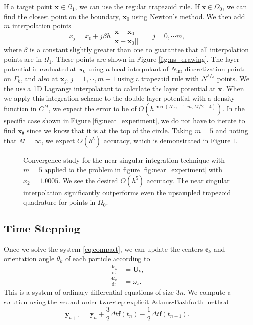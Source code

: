 If a target point $\mathbf{x}\in\Omega_1$, we can use the regular trapezoid rule. If $\mathbf{x}\in \Omega_0$, we can find the closest point on the boundary, $\mathbf{x}_0$ using Newton's method. We then add $m$ 
interpolation points
	\[ x_j = x_0 + j\beta h\frac{\mathbf{x}-\mathbf{x}_0}{||\mathbf{x}-\mathbf{x}_0||} \qquad j = 0,\cdots m,\]
where $\beta$ is a constant slightly greater than one to guarantee that all interpolation points are in $\Omega_1$. These points are shown in Figure \ref{fig:ns_drawing}. The layer potential is evaluated at $\mathbf{x}_0$ using a local interpolant of $N_\text{int}$ discretization points on $\Gamma_k$, and also at $\mathbf{x}_j$, $j=1,\cdots,m-1$ using a trapezoid rule with $N^{\sfrac{3}{2}}$ points.  We the use a 1D Lagrange interpolatant to calculate the layer potential at $\mathbf{x}$. When we apply this integration scheme to the double layer potential with a density function in $C^M$, we expect the error to be of $O(h^{\min(N_{\text{int}} - 1, m,  M/2 - 4)})$. In the specific case shown in Figure \ref{fig:near_experiment}, we do not have to iterate to find $\mathbf{x}_0$ since we know that it is at the top of the circle. Taking $m=5$ and noting that $M=\infty$, we expect $O(h^5)$ accuracy, which is demonstrated in Figure \ref{fig:ns_convergence}. 

\begin{figure}[!h]
\begin{center}

\caption[Convergence of the near singular integration scheme.]{Convergence  study for the near singular integration technique with $m=5$ applied to the problem in figure \ref{fig:near_experiment} with $x_2=1.0005$. We see the desired $O(h^5)$ accuracy. The near singular interpolation significantly outperforms even the upsampled trapezoid quadrature for points in $\Omega_0$. }\label{fig:ns_convergence}
\end{center}
\end{figure}




\subsection{Time Stepping}

Once we solve the system \eqref{eq:compact}, we can update the centers $\mathbf{c}_k$ and orientation angle $\theta_k$ of each particle according to
\begin{subequations}
	\begin{align}
		\frac{\text{d} \mathbf{c}_k}{\text{d} t} &= \mathbf{U}_k,\\
		\frac{\text{d}\theta_k}{\text{d} t} &= \omega_k.
	\end{align}
\end{subequations}
This is a system of ordinary differential equations of size $3n$. We compute a solution using the second order two-step explicit Adams-Bashforth method
\[ \mathbf{y}_{n+1} = \mathbf{y}_{n} + \frac{3}{2}\Delta t \mathbf{f}(t_{n}) - \frac{1}{2}\Delta t \mathbf{f}(t_{n-1}).\]

